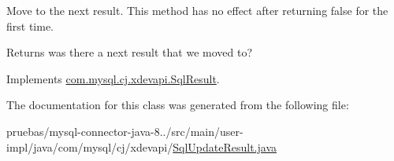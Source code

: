 Move to the next result. This method has no effect after returning {\ttfamily false} for the first time.

\begin{DoxyReturn}{Returns}
was there a next result that we moved to? 
\end{DoxyReturn}


Implements \mbox{\hyperlink{interfacecom_1_1mysql_1_1cj_1_1xdevapi_1_1_sql_result_ad5c821bd2efe2e952aef48dc574e913d}{com.\+mysql.\+cj.\+xdevapi.\+Sql\+Result}}.



The documentation for this class was generated from the following file\+:\begin{DoxyCompactItemize}
\item 
pruebas/mysql-\/connector-\/java-\/8../src/main/user-\/impl/java/com/mysql/cj/xdevapi/\mbox{\hyperlink{_sql_update_result_8java}{Sql\+Update\+Result.\+java}}\end{DoxyCompactItemize}
